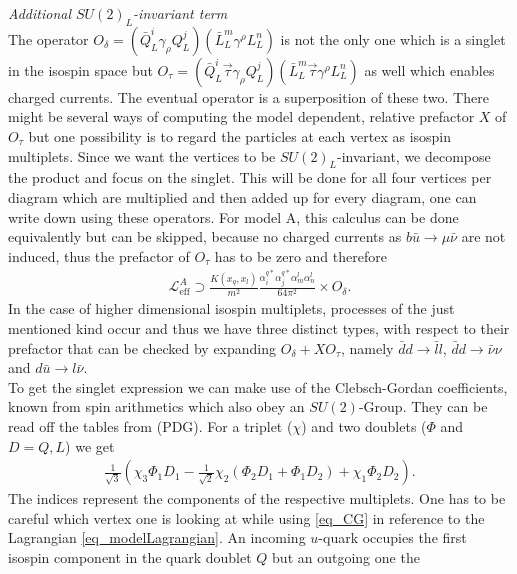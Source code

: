  \noindent \textit{Additional $SU(2)_L$-invariant term}\\
\noindent The operator $O_\delta=\left(\bar Q_L^i \gamma_\rho Q_L^j\right)\left(\bar L_L^m \gamma^\rho L_L^n\right)$ is not the only one which is a singlet
in the isospin space but $O_\tau=\left(\bar Q_L^i\vec \tau \gamma_\rho Q_L^j\right)\left(\bar L_L^m\vec \tau \gamma^\rho L_L^n\right)$ as well which enables
charged currents. The eventual operator is a superposition of these two. There might be several ways of computing the model dependent, relative 
prefactor $X$ of $O_\tau$  but one possibility is to regard the particles at each vertex as isospin multiplets. Since we want the vertices to be 
$SU(2)_L$-invariant, we 
decompose the product and focus on the singlet. This will be done for all four vertices per diagram which are multiplied and then added up for every diagram,
one can write down using these operators. For model A, this calculus can be done equivalently but can be skipped, because no charged currents as 
$b \bar u \rightarrow \mu \bar \nu$ are not induced, thus the prefactor of $O_\tau$ has to be zero and therefore 
\begin{align}
  \mathcal{L}^A_\text{eff} \supset \frac{K(x_q,x_l)}{m^2}\frac{\alpha_i^{q*} \alpha_j^{q*} \alpha_m^l \alpha_n^l}{64\pi^2} \times O_\delta.
 \label{eq_LagBSmumuModA}
\end{align}
In the case of higher dimensional isospin multiplets, processes of the just mentioned kind occur and thus we have three distinct types, with respect to 
their prefactor that can be checked by expanding $O_\delta + X O_\tau$, namely $\bar d d\rightarrow \bar l l$, $\bar d d \rightarrow \bar\nu \nu$ and 
$d \bar u\rightarrow l\bar\nu$. \\
\noindent To get the singlet expression we can make use of the Clebsch-Gordan coefficients, known from spin arithmetics which also obey an $SU(2)$-Group.
They can be read off the tables from (PDG). For a triplet ($\chi$) and two doublets ($\Phi$ and $D=Q,L$) we get
\begin{align}
 \frac{1}{\sqrt{3}}\left(\chi_3\Phi_1D_1 - \frac{1}{\sqrt{2}}\chi_2\left(\Phi_2D_1+\Phi_1 D_2\right) + \chi_1\Phi_2D_2 \right).
 \label{eq_CG}
\end{align}
The indices represent the components of the respective multiplets. One has to be careful which vertex one is looking at while using \eqref{eq_CG} in reference
to the Lagrangian \eqref{eq_modelLagrangian}. An incoming $u$-quark occupies the first isospin component in the quark doublet $Q$ but an outgoing one the 
